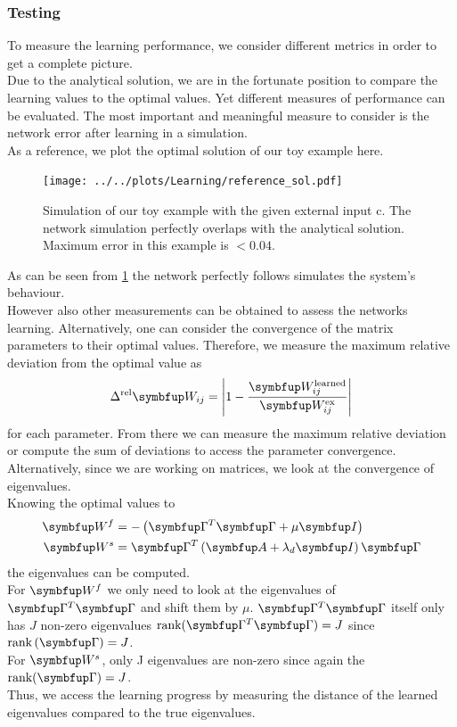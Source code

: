 \subsubsection{Testing}
To measure the learning performance, we consider different metrics in order to get a complete picture.\\
Due to the analytical solution, we are in the fortunate position to compare the learning values to the optimal values. Yet different measures of performance can be evaluated. The most important and meaningful measure to consider is the network error after learning in a simulation.\\
As a reference, we plot the optimal solution of our toy example here.
\begin{figure}
	\centering
	\texttt{[image: ../../plots/Learning/reference\_sol.pdf]}
	\caption{Simulation of our toy example with the given external input c. The network simulation perfectly overlaps with the analytical solution. Maximum error in this example is $<0.04$.}
	\label{fig:reference_sol}
\end{figure}
As can be seen from \cref{fig:reference_sol} the network perfectly follows simulates the system's behaviour.\\
However also other measurements can be obtained to assess the networks learning. Alternatively, one can consider the convergence of the matrix parameters to their optimal values. Therefore, we measure the maximum relative deviation from the optimal value as
\begin{equation}\label{eq:largest_rel_dev}
	\Delta^\text{rel} \bmu{W}_{ij} =\left|1 - \frac{\bmu{W}^{\text{learned}}_{ij}}{\bmu{W}^\text{ex}_{ij}}\right|
\end{equation}
for each parameter. From there we can measure the maximum relative deviation or compute the sum of deviations to access the parameter convergence.\\
Alternatively, since we are working on matrices, we look at the convergence of eigenvalues.\\
Knowing the optimal values to
\begin{equation}
\begin{aligned}
	\bmu{W}^f &= -\left(\bmu{\Gamma}^T\bmu{\Gamma} + \mu \bmu{I}\right)\\
	\bmu{W}^s &= \bmu{\Gamma}^T\left(\bmu{A} + \lambda_d\bmu{I}\right)\bmu{\Gamma}\\
\end{aligned}
\end{equation}
the eigenvalues can be computed.\\
For $\bmu{W}^f$ we only need to look at the eigenvalues of $\bmu{\Gamma}^T\bmu{\Gamma}$ and shift them by $\mu$. $\bmu{\Gamma}^T\bmu{\Gamma}$ itself only has $J$ non-zero eigenvalues $\text{rank}(\bmu{\Gamma}^T\bmu{\Gamma}) = J$ since $\text{rank}\left(
\bmu{\Gamma}\right) = J$.\\
For $\bmu{W}^s$, only J eigenvalues are non-zero since again the $\text{rank}(\bmu{\Gamma}) = J$.\\
Thus, we access the learning progress by measuring the distance of the learned eigenvalues compared to the true eigenvalues.\\


